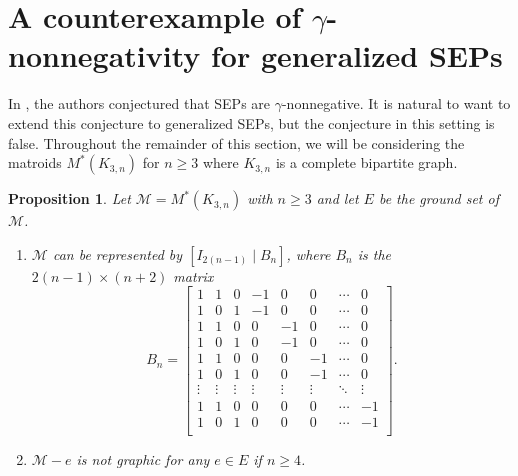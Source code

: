 \documentclass{amsart}
\numberwithin{equation}{section}
\theoremstyle{plain}
\newtheorem{prop}[thm]{Proposition}
\theoremstyle{definition}
\newcommand{\calM}{\mathcal{M}}
\begin{document}
\section{A counterexample of $\gamma$-nonnegativity for generalized SEPs}\label{sec: counterexample}

In \cite{OhsugiTsuchiya21}, the authors conjectured that SEPs are $\gamma$-nonnegative. 
It is natural to want to extend this conjecture to generalized SEPs, but the conjecture in this setting is false.
Throughout the remainder of this section, we will be considering the matroids $M^*(K_{3,n})$ for $n \geq 3$ where $K_{3,n}$ is a complete bipartite graph.

\begin{prop}\label{prop:gamma}
Let $\calM=M^*(K_{3,n})$ with $n \geq 3$ and let $E$ be the ground set of $\calM$. 
\begin{enumerate}[label={\rm (\roman*)}]
    \item $\calM$ can be represented by $[I_{2(n-1)} \mid B_n]$, where $B_n$ is the $2(n-1) \times (n+2)$ matrix \[
    B_n = 
    \begin{bmatrix}
        1 & 1 & 0 & -1 & 0 & 0 & \cdots & 0 \\
        1 & 0 & 1 & -1 & 0 & 0 & \cdots & 0 \\
        1 & 1 & 0 & 0 & -1 & 0 & \cdots & 0 \\
        1 & 0 & 1 & 0 & -1 & 0 & \cdots & 0 \\
        1 & 1 & 0 & 0 & 0 & -1 & \cdots & 0 \\
        1 & 0 & 1 & 0 & 0 & -1 & \cdots & 0 \\
        \vdots & \vdots & \vdots & \vdots & \vdots & \vdots & \ddots & \vdots \\
        1 & 1 & 0 & 0 & 0 & 0 & \cdots & -1 \\
        1 & 0 & 1 & 0 & 0 & 0 & \cdots & -1 \\
    \end{bmatrix}. 
\]
    \item $\calM - e$ is not graphic for any $e \in E$ if $n \geq 4$. 
\end{enumerate}
\end{prop}
\end{document}
